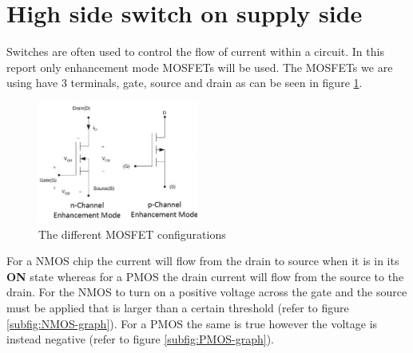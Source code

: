 \section{High side switch on supply side}
\label{sec:high}
Switches are often used to control the flow of current within a circuit. In this report only enhancement mode MOSFETs will be used. The MOSFETs we are using have 3 terminals, gate, source and drain as can be seen in figure \ref{fig:mosfets}.\begin{figure}
\centering
\includegraphics[height=4cm]{Figures/mosfetX.jpg}
\caption{The different MOSFET configurations}
\label{fig:mosfets}
\end{figure} For a NMOS chip the current will flow from the drain to source when it is in its \textbf{ON} state whereas for a PMOS the drain current will flow from the source to the drain. For the NMOS to turn on a positive voltage across the gate and the source must be applied that is larger than a certain threshold (refer to figure \ref{subfig:NMOS-graph}). For a PMOS the same is true however the voltage is instead negative (refer to figure \ref{subfig:PMOS-graph}).



